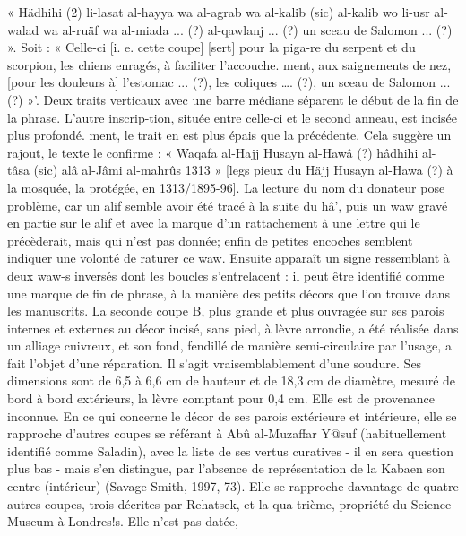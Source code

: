 « Hädhihi (2) li-lasat al-hayya wa al-agrab wa al-kalib (sic) al-kalib wo
li-usr al-walad wa al-ruäf wa al-miada ... (?) al-qawlanj ... (?) un sceau de Salomon ... (?) ». Soit : « Celle-ci [i. e. cette coupe] [sert] pour la piga-re du serpent et du scorpion, les chiens enragés, à faciliter l'accouche. ment, aux saignements de nez, [pour les douleurs à] l'estomac ... (?), les coliques …. (?), un sceau de Salomon ... (?) »'. Deux traits verticaux avec une barre médiane séparent le début de la fin de la phrase. L'autre inscrip-tion, située entre celle-ci et le second anneau, est incisée plus profondé. ment, le trait en est plus épais que la précédente. Cela suggère un rajout,
le texte le confirme : « Waqafa al-Hajj Husayn al-Hawâ (?) hâdhihi al-
tâsa (sic) alâ al-Jâmi al-mahrûs 1313 » [legs pieux du Häjj Husayn al-Hawa (?) à la mosquée, la protégée, en 1313/1895-96]. La lecture du nom du donateur pose problème, car un alif semble avoir été tracé à la suite du hâ', puis un waw gravé en partie sur le alif et avec la marque d'un rattachement à une lettre qui le précèderait, mais qui n'est pas donnée; enfin de petites encoches semblent indiquer une volonté de raturer ce waw.
Ensuite apparaît un signe ressemblant à deux waw-s inversés dont les boucles s'entrelacent : il peut être identifié comme une marque de fin de phrase, à la manière des petits décors que l'on trouve dans les manuscrits.
La seconde coupe B, plus grande et plus ouvragée sur ses parois internes et externes au décor incisé, sans pied, à lèvre arrondie, a été réalisée dans un alliage cuivreux, et son fond, fendillé de manière semi-circulaire par l'usage, a fait l'objet d'une réparation. Il s'agit vraisemblablement d'une soudure. Ses dimensions sont de 6,5 à 6,6 cm de hauteur et de 18,3 cm de diamètre, mesuré de bord à bord extérieurs, la lèvre comptant pour 0,4 cm. Elle est de provenance inconnue. En ce qui concerne le décor de ses parois extérieure et intérieure, elle se rapproche d'autres coupes se référant à Abû al-Muzaffar Y@suf (habituellement identifié comme Saladin), avec la liste de ses vertus curatives - il en sera question plus bas - mais s'en distingue, par l'absence de représentation de la Kabaen son centre (intérieur) (Savage-Smith, 1997, 73). Elle se rapproche davantage de quatre autres coupes, trois décrites par Rehatsek, et la qua-trième, propriété du Science Museum à Londres!s. Elle n'est pas datée,
 
